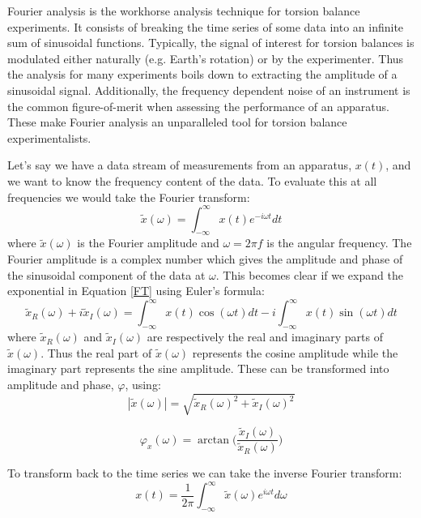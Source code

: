 \documentclass{book}
\begin{document}
\quad Fourier analysis is the workhorse analysis technique for torsion balance experiments. It consists of breaking the time series of some data into an infinite sum of sinusoidal functions. Typically, the signal of interest for torsion balances is modulated either naturally (e.g. Earth's rotation) or by the experimenter. Thus the analysis for many experiments boils down to extracting the amplitude of a sinusoidal signal. Additionally, the frequency dependent noise of an instrument is the common figure-of-merit when assessing the performance of an apparatus. These make Fourier analysis an unparalleled tool for torsion balance experimentalists.

Let's say we have a data stream of measurements from an apparatus, $x(t)$, and we want to know the frequency content of the data. To evaluate this at all frequencies we would take the Fourier transform:
\begin{equation}
\tilde x (\omega) = \int_{-\infty}^\infty x(t) e^{-i \omega t } dt \label{FT}
\end{equation}
where $\tilde x (\omega)$ is the Fourier amplitude and $\omega= 2\pi f$ is the angular frequency. The Fourier amplitude is a complex number which gives the amplitude and phase of the sinusoidal component of the data at $\omega$. This becomes clear if we expand the exponential in Equation \ref{FT} using Euler's formula:
\begin{equation}
\tilde x_R (\omega) +i \tilde x_I (\omega) = \int_{-\infty}^\infty x(t) \cos(\omega t) dt - i \int_{-\infty}^\infty x(t) \sin(\omega t) dt 
\end{equation}
where $\tilde x_R (\omega)$ and $\tilde x_I (\omega)$ are respectively the real and imaginary parts of $\tilde x (\omega)$. Thus the real part of $\tilde x (\omega)$ represents the cosine amplitude while the imaginary part represents the sine amplitude. These can be transformed into amplitude and phase, $\varphi$, using:
\begin{equation}
|\tilde x (\omega)|=\sqrt{\tilde x_R (\omega)^2 + \tilde x_I (\omega)^2}
\end{equation}

\begin{equation}
\varphi_x (\omega)=\arctan \bigg( \frac{\tilde x_I (\omega)}{\tilde x_R (\omega)} \bigg)
\end{equation}

To transform back to the time series we can take the inverse Fourier transform:
\begin{equation}
x(t) = \frac{1}{2\pi}\int_{-\infty}^\infty \tilde x (\omega) e^{i \omega t } d\omega \label{FT}
\end{equation}
\end{document}
